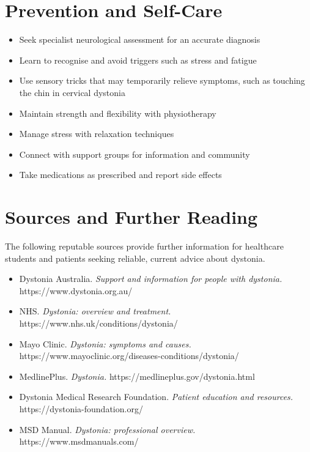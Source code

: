 \section*{Prevention and Self-Care}
\begin{itemize}
    \item Seek specialist neurological assessment for an accurate diagnosis
    \item Learn to recognise and avoid triggers such as stress and fatigue
    \item Use sensory tricks that may temporarily relieve symptoms, such as touching the chin in cervical dystonia
    \item Maintain strength and flexibility with physiotherapy
    \item Manage stress with relaxation techniques
    \item Connect with support groups for information and community
    \item Take medications as prescribed and report side effects
\end{itemize}

\section*{Sources and Further Reading}
The following reputable sources provide further information for healthcare students and patients seeking reliable, current advice about dystonia.
\begin{itemize}
    \item Dystonia Australia. \textit{Support and information for people with dystonia.} https://www.dystonia.org.au/
    \item NHS. \textit{Dystonia: overview and treatment.} https://www.nhs.uk/conditions/dystonia/
    \item Mayo Clinic. \textit{Dystonia: symptoms and causes.} https://www.mayoclinic.org/diseases-conditions/dystonia/
    \item MedlinePlus. \textit{Dystonia.} https://medlineplus.gov/dystonia.html
    \item Dystonia Medical Research Foundation. \textit{Patient education and resources.} https://dystonia-foundation.org/
    \item MSD Manual. \textit{Dystonia: professional overview.} https://www.msdmanuals.com/
\end{itemize}
